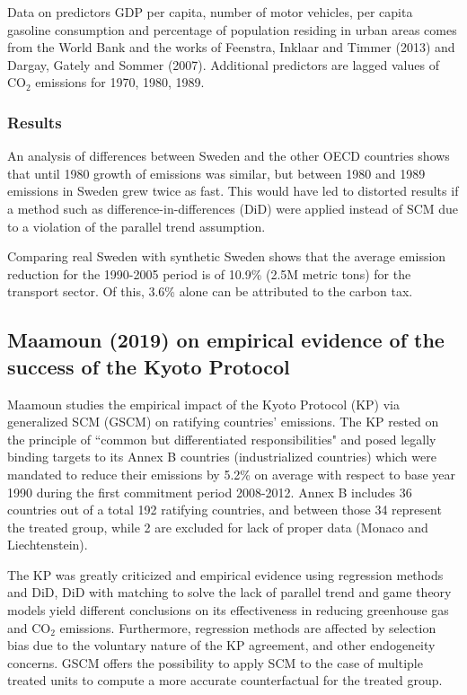 \documentclass[12pt,a4paper,draft]{article}
\begin{document}
Data on predictors GDP per capita, number of motor vehicles, per capita gasoline consumption 
and percentage of population residing in urban areas comes from the World Bank and the works 
of Feenstra, Inklaar and Timmer (2013) and Dargay, Gately and Sommer (2007). Additional 
predictors are lagged values of CO$_2$ emissions for 1970, 1980, 1989.

\subsubsection*{Results}
An analysis of differences between Sweden and the other OECD countries shows that 
until 1980 growth of emissions was similar, but between 1980 and 1989 emissions in Sweden 
grew twice as fast. This would have led to distorted results if a method such as 
difference-in-differences (DiD) were applied instead of SCM due to a violation of the 
parallel trend assumption.

Comparing real Sweden with synthetic Sweden shows that the average emission reduction for 
the 1990-2005 period is of 10.9\% (2.5M metric tons) for the transport sector. Of this, 
3.6\% alone can be attributed to the carbon tax.


\subsection{Maamoun (2019) on empirical evidence of the success of the Kyoto Protocol}
Maamoun studies the empirical impact of the Kyoto Protocol (KP) via generalized SCM (GSCM) 
on ratifying countries' emissions. 
The KP rested on the principle of ``common but differentiated responsibilities" and posed 
legally binding targets to its Annex B countries (industrialized countries) which were 
mandated to reduce their emissions by 5.2\% on average with respect to base year 1990 
during the first commitment period 2008-2012. 
Annex B includes 36 countries out of a total 192 ratifying countries, and between those 
34 represent the treated group, while 2 are excluded for lack of proper data (Monaco and 
Liechtenstein).

The KP was greatly criticized and empirical evidence using regression methods and DiD, DiD with 
matching to solve the lack of parallel trend and game theory models yield different conclusions 
on its effectiveness in reducing greenhouse gas and CO$_2$ emissions. Furthermore, 
regression methods are affected by selection bias due to the voluntary nature of the KP 
agreement, and other endogeneity concerns. GSCM offers the possibility to apply SCM to the case 
of multiple treated units to compute a more accurate counterfactual for the treated group. 
\end{document}

